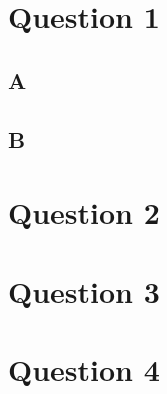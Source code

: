 \section*{Question 1}

\subsection*{A}

\subsection*{B}

\section*{Question 2}

\section*{Question 3}

\section*{Question 4}